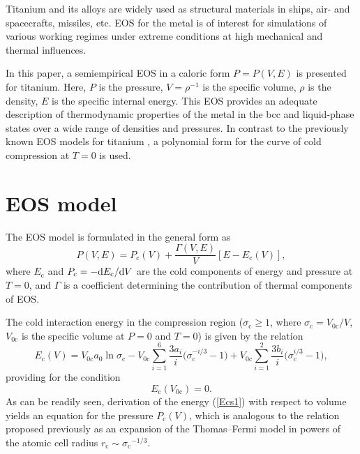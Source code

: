 \documentclass[a4paper]{jpconf}
\begin{document}
Titanium and its alloys are widely used as structural materials in ships, air- and spacecrafts, missiles, etc. EOS for the metal is of interest for simulations of various working regimes under extreme conditions at high mechanical and thermal influences.

In this paper, a semiempirical EOS in a caloric form $P = P(V, E)$ is presented for titanium. Here, $P$ is the pressure, $V=\rho^{-1}$ is the specific volume, $\rho$ is the density, $E$ is the specific internal energy. This EOS provides an adequate description of thermodynamic properties of the metal in the bcc and liquid-phase states over a wide range of densities and pressures. In contrast to the previously known EOS models for titanium \cite{Bushman-Lomonosov-Fortov-1992-metals-eng, Greeff-Trinkle-Albers-Ti-2001, Kerley-Ti-2003, Pecker-Eliezer-Fisher-Henis-Ti-2005, Molodets-Golyshev-Ti-2014}, a polynomial form \cite{Khishchenko-TPL-2004-eng} for the curve of cold compression at $T = 0$ is used.

\section{EOS model}
The EOS model is formulated in the general form as
%
\begin{equation}\label{PVE}
P(V,E)=P_\mathrm{c}(V)+\frac{\Gamma(V,E)}{V}\left[E-E_\mathrm{c}(V)\right],
\end{equation}
%
where $E_\mathrm{c}$ and $P_\mathrm{c}=-\mathrm{d} E_\mathrm{c}/\mathrm{d} V$ are the cold components of energy and pressure at $T=0$, and $\Gamma$ is a coefficient determining the contribution of thermal components of EOS.

The cold interaction energy in the compression region ($\sigma_\mathrm{c} \geqslant 1$, where $\sigma_\mathrm{c} = V_\mathrm{0c}/V$, $V_\mathrm{0c}$ is the specific volume at $P=0$ and $T=0$) is given by the relation \cite{Khishchenko-TPL-2004-eng}
%
\begin{equation}\label{Ecs1}
E_\mathrm{c}(V) = V_\mathrm{0c} a_0 \ln\sigma_\mathrm{c}-V_\mathrm{0c} \sum_{i=1}^{6} \frac{3a_i}{i} \Big(\sigma_\mathrm{c}^{-i/3}-1 \Big) + V_\mathrm{0c} \sum_{i=1}^{2} \frac{3b_i}{i} \Big(\sigma_\mathrm{c}^{i/3}-1 \Big),
\end{equation}
%
providing for the condition
%
\begin{equation}
E_\mathrm{c}(V_\mathrm{0c}) = 0.\label{E0c}
\end{equation}
%
As can be readily seen, derivation of the energy (\ref{Ecs1}) with respect to volume yields an equation for the pressure $P_\mathrm{c}(V)$, which is analogous to the relation proposed previously \cite{Kalitkin-Govorukhina-1965} as an expansion of the Thomas--Fermi model in powers of the atomic cell radius $r_\mathrm{c}\sim\sigma_\mathrm{c}\!^{-1/3}$.
\end{document}
